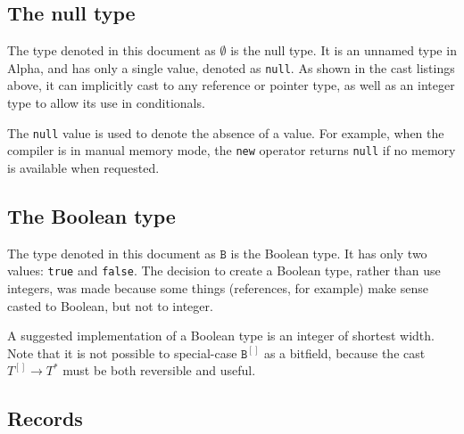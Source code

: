 \documentclass{article}
\newcommand{\R}[1]{\mathtt{#1}}
\begin{document}
\subsection{The null type}
\label{sub:types:null}
The type denoted in this document as $\emptyset$ is the null type. It is an
unnamed type in Alpha, and has only a single value, denoted as
\texttt{null}. As shown in the cast listings above, it can implicitly cast
to any reference or pointer type, as well as an integer type to allow its use
in conditionals.

The \texttt{null} value is used to denote the absence of a value. For example,
when the compiler is in manual memory mode, the \texttt{new} operator returns
\texttt{null} if no memory is available when requested.

\subsection{The Boolean type}
\label{sub:types:bool}
The type denoted in this document as $\R{B}$ is the Boolean type. It has only
two values: \texttt{true} and \texttt{false}. The decision to create a Boolean
type, rather than use integers, was made because some things (references, for
example) make sense casted to Boolean, but not to integer.

A suggested implementation of a Boolean type is an integer of shortest width.
Note that it is not possible to special-case $\R{B}^{[]}$ as a bitfield, because
the cast $T^{[]} \to T^*$ must be both reversible and useful.

\subsection{Records}
\label{sub:types:record}

\end{document}
